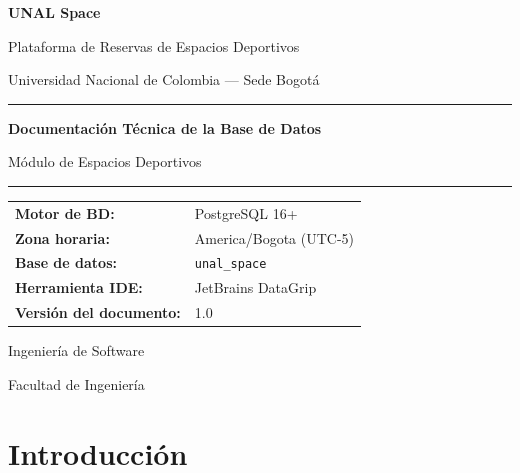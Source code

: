 \documentclass[12pt, a4paper]{article}
\begin{document}
\begin{titlepage}
    \centering
    \vspace*{2cm}

    {\Huge\bfseries\textcolor{unalverde}{UNAL Space}\par}
    \vspace{0.5cm}
    {\LARGE Plataforma de Reservas de Espacios Deportivos\par}
    \vspace{0.3cm}
    {\large Universidad Nacional de Colombia --- Sede Bogotá\par}

    \vspace{2cm}

    \rule{\textwidth}{1pt}
    \vspace{0.5cm}
    {\Large\bfseries Documentación Técnica de la Base de Datos\par}
    \vspace{0.2cm}
    {\large Módulo de Espacios Deportivos\par}
    \vspace{0.5cm}
    \rule{\textwidth}{1pt}

    \vspace{2cm}

    \begin{tabular}{ll}
        \textbf{Motor de BD:}      & PostgreSQL 16+ \\
        \textbf{Zona horaria:}     & America/Bogota (UTC-5) \\
        \textbf{Base de datos:}    & \texttt{unal\_space} \\
        \textbf{Herramienta IDE:}  & JetBrains DataGrip \\
        \textbf{Versión del documento:} & 1.0 \\
    \end{tabular}

    \vfill
    {\large Ingeniería de Software\par}
    {\large Facultad de Ingeniería\par}
    {\large\the\year\par}
\end{titlepage}

\tableofcontents
\newpage


\section{Introducción}
\end{document}
